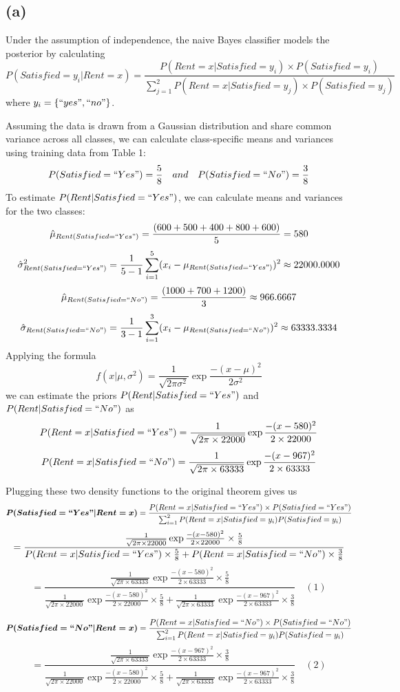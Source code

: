 \documentclass{article}
\begin{document}
\subsection{(a)} 
Under the assumption of independence, the naive Bayes classifier models the posterior by calculating \[P(Satisfied=y_i|Rent=x) = \frac{P(Rent=x|Satisfied=y_i)\times P(Satisfied=y_i)}{\sum_{j=1}^{2}P(Rent=x|Satisfied=y_j)\times P(Satisfied=y_j)}\] where $y_i = \{``yes", ``no"\}$.

Assuming the data is drawn from a Gaussian distribution and share common variance across all classes, we can calculate class-specific means and variances using training data from Table 1:
\[ P(Satisfied=``Yes") = \frac{5}{8} \quad and\quad P(Satisfied=``No") = \frac{3}{8} \]
To estimate $P(Rent|Satisfied=``Yes")$, we can calculate means and variances for the two classes:
\[ \hat{\mu}_{Rent(Satisfied=``Yes")} = \frac{(600+500+400+800+600)}{5} = 580 \]
\[ \hat{\sigma}^2_{Rent(Satisfied=``Yes")} = \frac{1}{5-1}\sum_{i=1}^{5}(x_i - \mu_{Rent(Satisfied=``Yes")})^2 \approx 22000.0000 \]
\[ \hat{\mu}_{Rent(Satisfied=``No")} = \frac{(1000+700+1200)}{3} \approx 966.6667\]
\[ \hat{\sigma}_{Rent(Satisfied=``No")} = \frac{1}{3-1}\sum_{i=1}^{3}(x_i - \mu_{Rent(Satisfied=``No")})^2 \approx 63333.3334 \]
Applying the formula \[f(x|\mu, \sigma^2) = \frac{1}{\sqrt{2\pi\sigma^2}}\exp{\frac{-(x-\mu)^2}{2\sigma^2}}\]
we can estimate the priors $P(Rent|Satisfied=``Yes")$ and $P(Rent|Satisfied=``No")$ as
\[ P(Rent=x|Satisfied=``Yes") = \frac{1}{\sqrt{2\pi\times22000}}\exp{\frac{-(x-580)^2}{2\times22000}}\]
\[ P(Rent=x|Satisfied=``No") = \frac{1}{\sqrt{2\pi\times63333}}\exp{\frac{-(x-967)^2}{2\times63333}}\]

Plugging these two density functions to the original theorem gives us
\[
\boldsymbol{P(Satisfied=``Yes"|Rent=x)} = \frac{P(Rent=x|Satisfied=``Yes")\times P(Satisfied=``Yes")}{\sum_{i=1}^{2}P(Rent=x|Satisfied=y_i)P(Satisfied=y_i)} \]
\[= \frac{\frac{1}{\sqrt{2\pi\times22000}}\exp{\frac{-(x-580)^2}{2\times22000}}\times \frac{5}{8}}{P(Rent=x|Satisfied=``Yes")\times\frac{5}{8} + P(Rent=x|Satisfied=``No")\times\frac{3}{8}}\]\[ 
= \frac{\frac{1}{\sqrt{2\pi\times63333}}\exp{\frac{-(x-580)^2}{2\times63333}}\times \frac{5}{8}}{\frac{1}{\sqrt{2\pi\times22000}}\exp{\frac{-(x-580)^2}{2\times22000}}\times\frac{5}{8} + \frac{1}{\sqrt{2\pi\times63333}}\exp{\frac{-(x-967)^2}{2\times63333}}\times\frac{3}{8}}
\quad (1)\]

\[
\boldsymbol{P(Satisfied=``No"|Rent=x)} = \frac{P(Rent=x|Satisfied=``No")\times P(Satisfied=``No")}{\sum_{i=1}^{2}P(Rent=x|Satisfied=y_i)P(Satisfied=y_i)}  \]\[
=\frac{\frac{1}{\sqrt{2\pi\times63333}}\exp{\frac{-(x-967)^2}{2\times63333}}\times\frac{3}{8}}{ \frac{1}{\sqrt{2\pi\times22000}}\exp{\frac{-(x-580)^2}{2\times22000}}\times\frac{5}{8} + \frac{1}{\sqrt{2\pi\times63333}}\exp{\frac{-(x-967)^2}{2\times63333}}\times\frac{3}{8}} \quad (2) \]
\end{document}
